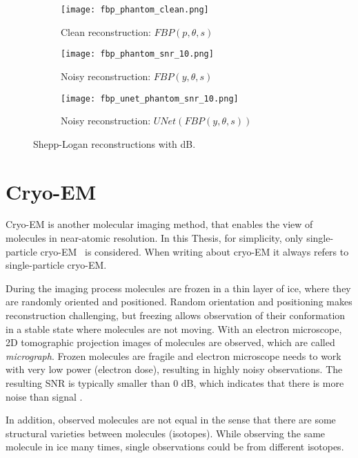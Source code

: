 \begin{figure}[H]
    \captionsetup[subfigure]{justification=centering}
    \centering
    \begin{subfigure}[t]{0.3\textwidth}
        \texttt{[image: fbp\_phantom\_clean.png]}
        \caption{Clean reconstruction: $\textit{FBP}(p, \theta, s)$}
        \label{fig:fbp_phantom}
    \end{subfigure}\hfill
    \begin{subfigure}[t]{0.3\textwidth}
      \texttt{[image: fbp\_phantom\_snr\_10.png]}
      \caption{Noisy reconstruction: $\textit{FBP}(y, \theta, s)$}
      \label{fig:fbp_phantom_noisy}
    \end{subfigure}\hfill
    \begin{subfigure}[t]{0.3\textwidth}
      \texttt{[image: fbp\_unet\_phantom\_snr\_10.png]}
      \caption{Noisy reconstruction: $\textit{UNet}(\textit{FBP}(y, \theta, s))$}
      \label{fig:fbp_unet_phantom_noisy}
    \end{subfigure}
    \caption{Shepp-Logan reconstructions with  dB.}
    \label{fig:phantom_fbps}
  \end{figure}


\section{Cryo-EM}
Cryo-EM is another molecular imaging method, that enables the view of molecules in near-atomic resolution.
In this Thesis, for simplicity, only single-particle cryo-EM~\cite{singleParticleCryoEm} is considered.
When writing about cryo-EM it always refers to single-particle cryo-EM.

During the imaging process molecules are frozen in a thin layer of ice, where they are randomly oriented and positioned. 
Random orientation and positioning makes reconstruction challenging, 
but freezing allows observation of their conformation in a stable state where molecules are not moving.
With an electron microscope, 2D tomographic projection images of molecules are observed,
which are called \textit{micrograph}. 
Frozen molecules are fragile and electron microscope needs to work with
very low power (electron dose), resulting in highly noisy observations. The resulting SNR
is typically smaller than 0 dB, which indicates that there is more noise than signal \cite{cryoEmMath2}.

In addition, observed molecules are not equal in the sense that there are some structural varieties between
molecules (isotopes). While observing the same molecule in ice many times, single observations could be from different isotopes.


